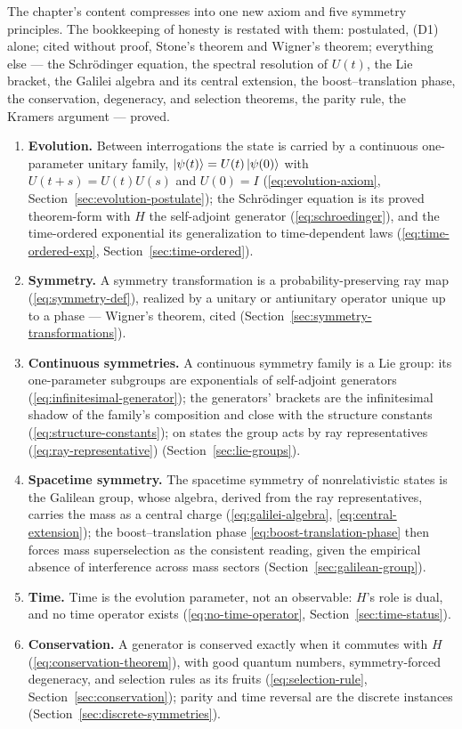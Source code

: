 The chapter's content compresses into one new axiom and five symmetry principles. The bookkeeping of honesty is restated with them: postulated, (D1) alone; cited without proof, Stone's theorem and Wigner's theorem; everything else --- the Schr\"odinger equation, the spectral resolution of $U(t)$, the Lie bracket, the Galilei algebra and its central extension, the boost--translation phase, the conservation, degeneracy, and selection theorems, the parity rule, the Kramers argument --- proved.
\begin{enumerate}
    \item[\textbf{(D1)}] \textbf{Evolution.} Between interrogations the state is carried by a continuous one-parameter unitary family, $\ket{\psi(t)} = U(t)\ket{\psi(0)}$ with $U(t+s) = U(t)U(s)$ and $U(0) = I$ (\eqref{eq:evolution-axiom}, Section~\ref{sec:evolution-postulate}); the Schr\"odinger equation is its proved theorem-form with $H$ the self-adjoint generator (\eqref{eq:schroedinger}), and the time-ordered exponential its generalization to time-dependent laws (\eqref{eq:time-ordered-exp}, Section~\ref{sec:time-ordered}).
    \item[\textbf{(S1)}] \textbf{Symmetry.} A symmetry transformation is a probability-preserving ray map (\eqref{eq:symmetry-def}), realized by a unitary or antiunitary operator unique up to a phase --- Wigner's theorem, cited (Section~\ref{sec:symmetry-transformations}).
    \item[\textbf{(S2)}] \textbf{Continuous symmetries.} A continuous symmetry family is a Lie group: its one-parameter subgroups are exponentials of self-adjoint generators (\eqref{eq:infinitesimal-generator}); the generators' brackets are the infinitesimal shadow of the family's composition and close with the structure constants (\eqref{eq:structure-constants}); on states the group acts by ray representatives (\eqref{eq:ray-representative}) (Section~\ref{sec:lie-groups}).
    \item[\textbf{(S3)}] \textbf{Spacetime symmetry.} The spacetime symmetry of nonrelativistic states is the Galilean group, whose algebra, derived from the ray representatives, carries the mass as a central charge (\eqref{eq:galilei-algebra}, \eqref{eq:central-extension}); the boost--translation phase \eqref{eq:boost-translation-phase} then forces mass superselection as the consistent reading, given the empirical absence of interference across mass sectors (Section~\ref{sec:galilean-group}).
    \item[\textbf{(S4)}] \textbf{Time.} Time is the evolution parameter, not an observable: $H$'s role is dual, and no time operator exists (\eqref{eq:no-time-operator}, Section~\ref{sec:time-status}).
    \item[\textbf{(S5)}] \textbf{Conservation.} A generator is conserved exactly when it commutes with $H$ (\eqref{eq:conservation-theorem}), with good quantum numbers, symmetry-forced degeneracy, and selection rules as its fruits (\eqref{eq:selection-rule}, Section~\ref{sec:conservation}); parity and time reversal are the discrete instances (Section~\ref{sec:discrete-symmetries}).
\end{enumerate}

